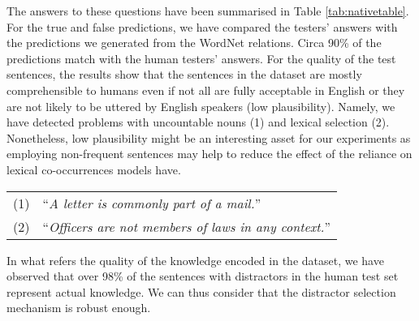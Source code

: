 \documentclass[11pt]{article}
\newcommand{\WORDNET}{WordNet}
\begin{document}
\begin{table}[tb]
\caption{Human evaluation of the quality of the sentences in the dataset.}
\label{tab:nativetable}
\end{table}
 

The answers to these questions have been summarised in Table \ref{tab:nativetable}. For the true and false predictions, we have compared the testers' answers with the predictions we generated from the \WORDNET{} relations. Circa 90\% of the predictions match with the human testers' answers.  For the quality of the test sentences, the results show that the sentences in the dataset are mostly comprehensible to humans even if not all are fully acceptable in English or they are not likely to be uttered by English speakers (low plausibility). Namely, we have detected problems with uncountable nouns (1) and lexical selection (2). Nonetheless, low plausibility might be an interesting asset for our experiments as employing non-frequent sentences may help to reduce the effect of the reliance on lexical co-occurrences models have.

\begin{table}[h]
    \centering
    \begin{tabular}{lp{6cm}}
        (1) & ``{\it A letter is commonly part of a mail.}'' \\
        (2) & ``{\it Officers are not members of laws in any context.}''
\end{tabular}
\end{table}

In what refers the quality of the knowledge encoded in the dataset, we have observed that over 98\% of the sentences with distractors in the human test set represent actual knowledge. We can thus consider that the distractor selection mechanism is robust enough. 
\end{document}
